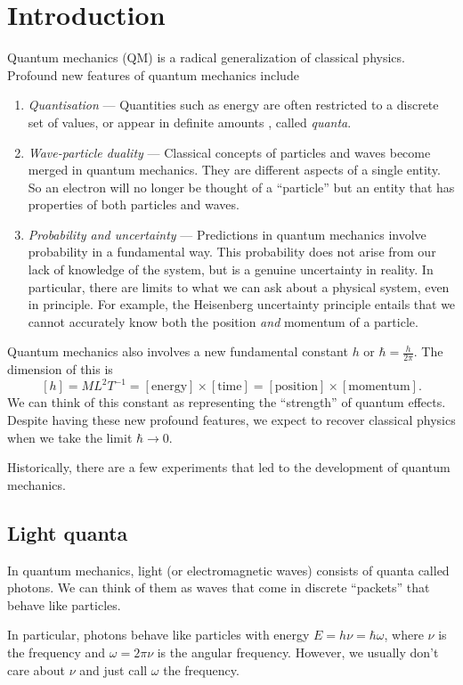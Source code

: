 \documentclass[a4paper]{article}
\begin{document}
\section{Introduction}
Quantum mechanics (QM) is a radical generalization of classical physics. Profound new features of quantum mechanics include
\begin{enumerate}
  \item \emph{Quantisation} --- Quantities such as energy are often restricted to a discrete set of values, or appear in definite amounts , called \emph{quanta}.
  \item \emph{Wave-particle duality} --- Classical concepts of particles and waves become merged in quantum mechanics. They are different aspects of a single entity. So an electron will no longer be thought of a ``particle'' but an entity that has properties of both particles and waves.
  \item \emph{Probability and uncertainty} --- Predictions in quantum mechanics involve probability in a fundamental way. This probability does not arise from our lack of knowledge of the system, but is a genuine uncertainty in reality. In particular, there are limits to what we can ask about a physical system, even in principle. For example, the Heisenberg uncertainty principle entails that we cannot accurately know both the position \emph{and} momentum of a particle.
\end{enumerate}
Quantum mechanics also involves a new fundamental constant $h$ or $\hbar = \frac{h}{2\pi}$. The dimension of this is
\[
  [h] = ML^2T^{-1} = [\text{energy}]\times [\text{time}] = [\text{position}] \times [\text{momentum}].
\]
We can think of this constant as representing the ``strength'' of quantum effects. Despite having these new profound features, we expect to recover classical physics when we take the limit $\hbar \to 0$.

Historically, there are a few experiments that led to the development of quantum mechanics.
\subsection{Light quanta}
In quantum mechanics, light (or electromagnetic waves) consists of quanta called photons. We can think of them as waves that come in discrete ``packets'' that behave like particles.

In particular, photons behave like particles with energy $E = h \nu = \hbar \omega$, where $\nu$ is the frequency and $\omega = 2\pi \nu$ is the angular frequency. However, we usually don't care about $\nu$ and just call $\omega$ the frequency.
\end{document}
